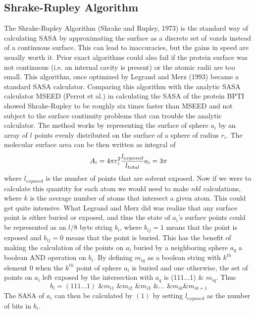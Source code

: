 \documentclass{article}
\begin{document}
\subsection{Shrake-Rupley Algorithm}
The Shrake-Rupley Algorithm (Shrake and Rupley, 1973) is the standard way of calculating SASA by approximating the surface as a discrete set of voxels instead of a continuous surface. This can lead to inaccuracies, but the gains in speed are usually worth it. Prior exact algorithms could also fail if the protein surface was not continuous (i.e. an internal cavity is present) or the atomic radii are too small. This algorithm, once optimized by Legrand and Merz (1993) became a standard SASA calculator. Comparing this algorithm with the analytic SASA calculator MSEED (Perrot et al.) in calculating the SASA of the protein BPTI showed Shrake-Rupley to be roughly six times faster than MSEED and not subject to the surface continuity problems that can trouble the analytic calculator. The method works by representing the surface of sphere $a_i$ by an array of $l$ points evenly distributed on the surface of a sphere of radius $r_i$. The molecular surface area can be then written as integral of 
\begin{equation}
A_i=4\pi r_i^2\frac{l_{exposed}}{l_{total}} \\
a_i = 3\pi
\end{equation}
where $l_{exposed}$ is the number of points that are solvent exposed. Now if we were to calculate this quantity for each atom we would need to make $nkl$ calculations, where $k$ is the average number of atoms that intersect a given atom. This could get quite intensive. What Legrand and Merz did was realize that any surface point is either buried or exposed, and thus the state of $a_i$'s surface points could be represented as an $l/8$ byte string $b_i$, where $b_{ij}=1$ means that the point is exposed and $b_{ij}=0$ means that the point is buried. This has the benefit of making the calculation of the points on $a_i$ buried by a neighboring sphere $a_q$ a boolean AND operation on $b_i$. By defining $m_{iq}$ as a boolean string with $k^{th}$ element 0 when the $k^{th}$ point of sphere $a_i$ is buried and one otherwise, the set of points on $a_i$ left exposed by the intersection with $a_q$ is (111...1) \& $m_{iq}$. Thus 
\begin{equation*}
b_i=(111...1) \text{ \& } m_{i1} \text{ \& } m_{i2} \text{ \& } m_{i3} \text{ \& }...\text{ \& } m_{ik} \& m_{ik+1}
\end{equation*}
The SASA of $a_i$ can then be calculated by $(1)$ by setting $l_{exposed}$ as the number of bits in $b_i$. \par
\end{document}

